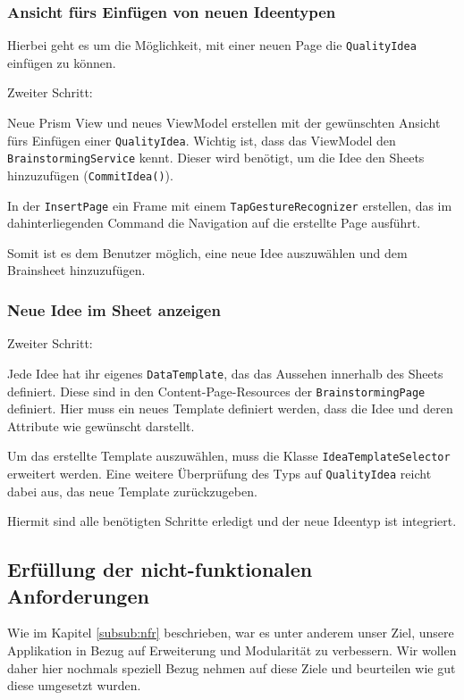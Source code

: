 \subsubsection{Ansicht fürs Einfügen von neuen Ideentypen}
Hierbei geht es um die Möglichkeit, mit einer neuen Page die \texttt{QualityIdea} einfügen zu können.

\begin{labeling}{Zweiter Schritt:}
	\item[Erster Schritt: ]	Neue Prism View und neues ViewModel erstellen mit der gewünschten Ansicht fürs Einfügen einer \texttt{QualityIdea}. Wichtig ist, dass das ViewModel den \texttt{Brainstorming\-Service} kennt. Dieser wird benötigt, um die Idee den Sheets hinzuzufügen (\texttt{CommitIdea()}). 
	\item[Zweiter Schritt: ] In der \texttt{InsertPage} ein Frame mit einem \texttt{TapGestureRecognizer} erstellen, das im dahinterliegenden Command die Navigation auf die erstellte Page ausführt.
\end{labeling}

Somit ist es dem Benutzer möglich, eine neue Idee auszuwählen und dem Brainsheet hinzuzufügen. 

\subsubsection{Neue Idee im Sheet anzeigen}
\begin{labeling}{Zweiter Schritt:}
	\item[Erster Schritt: ] Jede Idee hat ihr eigenes \texttt{DataTemplate}, das das Aussehen innerhalb des Sheets definiert. Diese sind in den Content-Page-Resources der \texttt{Brain\-storming\-Page} definiert. Hier muss ein neues Template definiert werden, dass die Idee und deren Attribute wie gewünscht darstellt. 
	\item[Zweiter Schritt: ] Um das erstellte Template auszuwählen, muss die Klasse \texttt{Idea\-Template\-Selector} erweitert werden. Eine weitere Überprüfung des Typs auf \texttt{Qua\-lity\-Idea} reicht dabei aus, das neue Template zurückzugeben.
\end{labeling}

Hiermit sind alle benötigten Schritte erledigt und der neue Ideentyp ist integriert. 


\subsection{Erfüllung der nicht-funktionalen Anforderungen} 
Wie im Kapitel \ref{subsub:nfr} beschrieben, war es unter anderem unser Ziel, unsere Applikation in Bezug auf Erweiterung und Modularität zu verbessern. Wir wollen daher hier nochmals speziell Bezug nehmen auf diese Ziele und beurteilen wie gut diese umgesetzt wurden.

